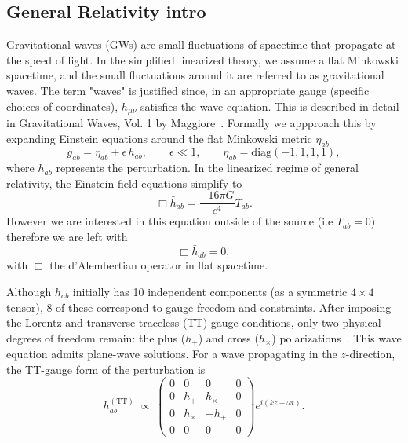 \documentclass[12pt]{article}
\begin{document}
\subsection{General Relativity intro}
\label{sec:GRintro}
Gravitational waves (GWs) are small fluctuations of spacetime that propagate at the speed of light. In the simplified linearized theory, we assume a flat Minkowski spacetime, and the small fluctuations around it are referred to as gravitational waves. The term "waves" is justified since, in an appropriate gauge (specific choices of coordinates), \(h_{\mu\nu}\) satisfies the wave equation. This is described in detail in Gravitational Waves, Vol. 1 by Maggiore~\cite[Sec~ 1.1]{GRbook}.
Formally we appproach this by expanding Einstein equations around the flat Minkowski metric $\eta _{a b}$ 
\begin{equation}
g_{ab} = \eta_{ab} + \epsilon\,h_{ab},
\qquad
\epsilon \ll 1,
\qquad
\eta_{ab} = \mathrm{diag}(-1, 1, 1, 1),
\end{equation}
where \(h_{ab}\) represents the perturbation. In the linearized regime of general relativity, the Einstein field equations simplify to
\begin{equation}
    \Box \bar{h}_{ab} = \frac{-16\pi G}{c^4} T_{ab}.
\end{equation}
However we are interested in this equation outside of the source (i.e $T_{ab} =0$) therefore we are left with 
\begin{equation}
    \Box \bar{h}_{ab} = 0, 
\end{equation}
with \(\Box\) the d’Alembertian operator in flat spacetime.
%

Although \(h_{ab}\) initially has 10 independent components (as a symmetric $4 \times 4$ tensor), 8 of these correspond to gauge freedom and constraints. After imposing the Lorentz and transverse-traceless (TT) gauge conditions, only two physical degrees of freedom remain: the plus (\(h_+\)) and cross (\(h_\times\)) polarizations~\cite[Sec.~1.2]{GRbook}.
This wave equation admits plane-wave solutions. For a wave propagating in the \(z\)-direction, the TT-gauge form of the perturbation is
\begin{equation}
h_{ab}^{(\mathrm{TT})} \;\propto\;
\begin{pmatrix}
0 & 0 & 0 & 0 \\
0 & h_+ & h_\times & 0 \\
0 & h_\times & -h_+ & 0 \\
0 & 0 & 0 & 0
\end{pmatrix}
e^{i(kz-\omega t)}.
\end{equation}
\end{document}
